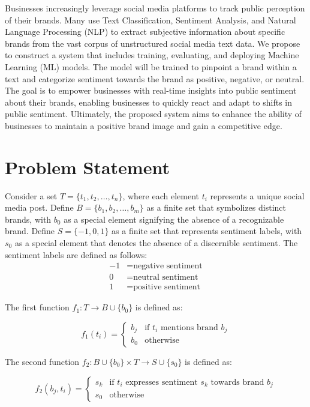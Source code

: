 \documentclass{article}
\begin{document}
Businesses increasingly leverage social media platforms to track public
perception of their brands. Many use Text Classification, Sentiment Analysis,
and Natural Language Processing (NLP) to extract subjective information about
specific brands from the vast corpus of unstructured social media text data. We
propose to construct a system that includes training, evaluating, and deploying
Machine Learning (ML) models. The model will be trained to pinpoint a brand
within a text and categorize sentiment towards the brand as positive, negative,
or neutral. The goal is to empower businesses with real-time insights into
public sentiment about their brands, enabling businesses to quickly react and
adapt to shifts in public sentiment. Ultimately, the proposed system aims to
enhance the ability of businesses to maintain a positive brand image and gain a
competitive edge.

\section{Problem Statement}

Consider a set $T = \{t_1, t_2, \ldots, t_n\}$, where each element $t_i$
represents a unique social media post. Define $B = \{b_1, b_2, \ldots, b_m\}$
as a finite set that symbolizes distinct brands, with $b_0$ as a special
element signifying the absence of a recognizable brand. Define $S = \{-1, 0,
    1\}$ as a finite set that represents sentiment labels, with $s_0$ as a
special
element that denotes the absence of a discernible sentiment. The sentiment
labels are defined as follows:
\begin{align*}
    -1 & = \text{negative sentiment} \\
    0  & = \text{neutral sentiment}  \\
    1  & = \text{positive sentiment}
\end{align*}

The first function $f_1: T \rightarrow B \cup \{b_0\}$ is defined as:

\[
    f_1(t_i) =
    \begin{cases}
        b_j & \text{if } t_i \text{ mentions brand } b_j \\
        b_0 & \text{otherwise}
    \end{cases}
\]

The second function $f_2: B \cup \{b_0\} \times T \rightarrow S \cup \{s_0\}$
is defined as:

\[
    f_2(b_j, t_i) =
    \begin{cases}
        s_k & \text{if } t_i \text{ expresses sentiment } s_k \text{ towards
        brand } b_j                                                          \\
        s_0 & \text{otherwise}
    \end{cases}
\]
\end{document}
